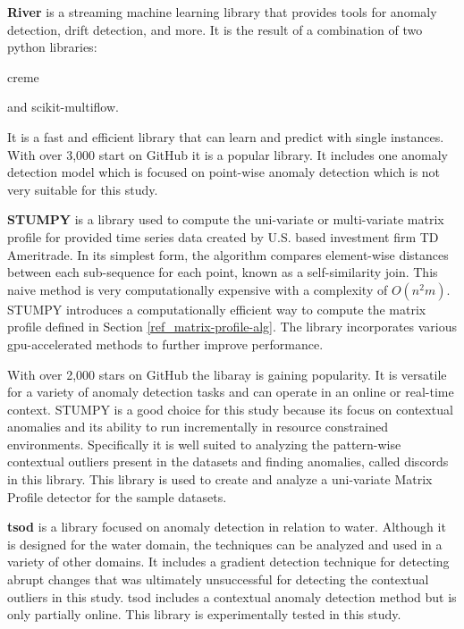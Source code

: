 \textbf{River} \parencite{2020river} is a streaming machine learning library that provides tools for anomaly detection, drift detection, and more. It is the result of a combination of two python libraries: 
\begin{inlinelist}
    \item creme
    \item and scikit-multiflow.
\end{inlinelist} It is a fast and efficient library that can learn and predict with single instances. With over 3,000 start on GitHub it is a popular library. It includes one anomaly detection model which is focused on point-wise anomaly detection which is not very suitable for this study.

\textbf{STUMPY} \parencite{law2019stumpy} is a library used to compute the uni-variate or multi-variate matrix profile for provided time series data created by U.S. based investment firm TD Ameritrade. In its simplest form, the algorithm compares element-wise distances between each sub-sequence for each point, known as a self-similarity join. This naive method is very computationally expensive with a complexity of $O(n^2m)$. STUMPY introduces a computationally efficient way to compute the matrix profile defined in Section \ref{ref_matrix-profile-alg}. The library incorporates various gpu-accelerated methods to further improve performance.

With over 2,000 stars on GitHub the libaray is gaining popularity. It is versatile for a variety of anomaly detection tasks and can operate in an online or real-time context. STUMPY is a good choice for this study because its focus on contextual anomalies and its ability to run incrementally in resource constrained environments. Specifically it is well suited to analyzing the pattern-wise contextual outliers present in the datasets and finding anomalies, called discords in this library. This library is used to create and analyze a uni-variate Matrix Profile detector for the sample datasets. 

\textbf{tsod} \parencite{tsod} is a library focused on anomaly detection in relation to water. Although it is designed for the water domain, the techniques can be analyzed and used in a variety of other domains. It includes a gradient detection technique for detecting abrupt changes that was ultimately unsuccessful for detecting the contextual outliers in this study. tsod includes a contextual anomaly detection method but is only partially online. This library is experimentally tested in this study.

